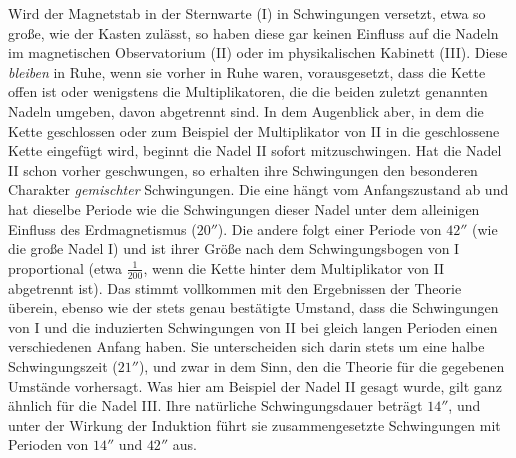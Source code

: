 Wird der Magnetstab in der Sternwarte (I) in Schwingungen versetzt, etwa so große, wie der Kasten zulässt, so haben diese gar keinen Einfluss auf die Nadeln im magnetischen Observatorium (II) oder im physikalischen Kabinett (III). Diese \textit{bleiben} in Ruhe, wenn sie vorher in Ruhe waren, vorausgesetzt, dass die Kette offen ist oder wenigstens die Multiplikatoren, die die beiden zuletzt genannten Nadeln umgeben, davon abgetrennt sind. In dem Augenblick aber, in dem die Kette geschlossen oder zum Beispiel der Multiplikator von II in die geschlossene Kette eingefügt wird, beginnt die Nadel II sofort mitzuschwingen. Hat die Nadel II schon vorher geschwungen, so erhalten ihre Schwingungen den besonderen Charakter \textit{gemischter} Schwingungen. Die eine hängt vom Anfangszustand ab und hat dieselbe Periode wie die Schwingungen dieser Nadel unter dem alleinigen Einfluss des Erdmagnetismus ($20''$). Die andere folgt einer Periode von $42''$ (wie die große Nadel I) und ist ihrer Größe nach dem Schwingungsbogen von I proportional (etwa $\frac{1}{200}$, wenn die Kette hinter dem Multiplikator von II abgetrennt ist). Das stimmt vollkommen mit den Ergebnissen der Theorie überein, ebenso wie der stets genau bestätigte Umstand, dass die Schwingungen von I und die induzierten Schwingungen von II bei gleich langen Perioden einen verschiedenen Anfang haben. Sie unterscheiden sich darin stets um eine halbe Schwingungszeit ($21''$), und zwar in dem Sinn, den die Theorie für die gegebenen Umstände vorhersagt. Was hier am Beispiel der Nadel II gesagt wurde, gilt ganz ähnlich für die Nadel III. Ihre natürliche Schwingungsdauer beträgt $14''$, und unter der Wirkung der Induktion führt sie zusammengesetzte Schwingungen mit Perioden von $14''$ und $42''$ aus.

